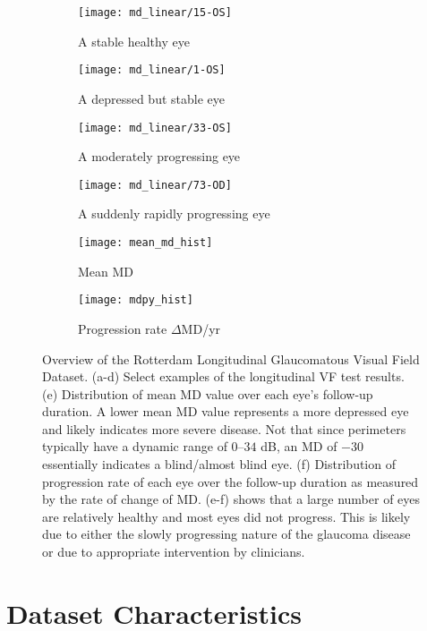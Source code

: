 \begin{figure}[p]
	\centering
	\begin{subfigure}[b]{0.49\textwidth}
		\centering
		\texttt{[image: md\_linear/15-OS]}
		\caption{A stable healthy eye}
	\end{subfigure}
	\hfill
	\begin{subfigure}[b]{0.49\textwidth}
		\centering
		\texttt{[image: md\_linear/1-OS]}
		\caption{A depressed but stable eye}
	\end{subfigure}
	\hfill
	\begin{subfigure}[b]{0.49\textwidth}
		\centering
		\texttt{[image: md\_linear/33-OS]}
		\caption{A moderately progressing eye}
	\end{subfigure}
	\hfill
	\begin{subfigure}[b]{0.49\textwidth}
		\centering
		\texttt{[image: md\_linear/73-OD]}
		\caption{A suddenly rapidly progressing eye}
	\end{subfigure}
	\hfill
	\begin{subfigure}[b]{0.49\textwidth}
		\centering
		\texttt{[image: mean\_md\_hist]}
		\caption{Mean MD}
		\label{fig:mean_md_hist}
	\end{subfigure}
	\hfill
	\begin{subfigure}[b]{0.49\textwidth}
		\centering
		\texttt{[image: mdpy\_hist]}
		\caption{Progression rate $\Delta$MD/yr}
		\label{fig:mdpy_hist}
	\end{subfigure}
	\caption[Overview of the Rotterdam Longitudinal Glaucomatous Visual Field Dataset]{Overview of the Rotterdam Longitudinal Glaucomatous Visual Field Dataset. (a-d) Select examples of the longitudinal \acl{VF} test results. (e) Distribution of mean MD value over each eye's follow-up duration. A lower mean MD value represents a more depressed eye and likely indicates more severe disease. Not that since perimeters typically have a dynamic range of $0$--$34$ dB, an MD of $-30$ essentially indicates a blind/almost blind eye. (f) Distribution of progression rate of each eye over the follow-up duration as measured by the rate of change of MD. (e-f) shows that a large number of eyes are relatively healthy and most eyes did not progress. This is likely due to either the slowly progressing nature of the glaucoma disease or due to appropriate intervention by clinicians.}
\end{figure}

\section{Dataset Characteristics}

